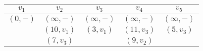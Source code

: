 
\begin{tabular}{ccccc} \hline
$v_1$               & $v_2$                 & $v_3$                 & $v_4$                 & $v_5$ \\\hline
\underline{$(0,-)$} & $(\infty,-)$          & $(\infty,-)$          & $(\infty,-)$          & $(\infty,-)$ \\
                    & $(10,v_1)$            & \underline{$(3,v_1)$} & $(11,v_3)$            & \underline{$(5,v_3)$} \\
                    & \underline{$(7,v_3)$} &                       & \underline{$(9,v_2)$} & \\\hline
\end{tabular}
